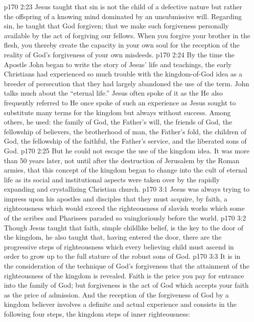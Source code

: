 \vs p170 2:23 Jesus taught that sin is not the child of a defective nature but rather the offspring of a knowing mind dominated by an unsubmissive will. Regarding sin, he taught that God  forgiven; that we make such forgiveness personally available by the act of forgiving our fellows. When you forgive your brother in the flesh, you thereby create the capacity in your own soul for the reception of the reality of God’s forgiveness of your own misdeeds.
\vs p170 2:24 By the time the Apostle John began to write the story of Jesus’ life and teachings, the early Christians had experienced so much trouble with the kingdom\hyp{}of\hyp{}God idea as a breeder of persecution that they had largely abandoned the use of the term. John talks much about the “eternal life.” Jesus often spoke of it as the  He also frequently referred to  He once spoke of such an experience as  Jesus sought to substitute many terms for the kingdom but always without success. Among others, he used: the family of God, the Father’s will, the friends of God, the fellowship of believers, the brotherhood of man, the Father’s fold, the children of God, the fellowship of the faithful, the Father’s service, and the liberated sons of God.
\vs p170 2:25 But he could not escape the use of the kingdom idea. It was more than 50 years later, not until after the destruction of Jerusalem by the Roman armies, that this concept of the kingdom began to change into the cult of eternal life as its social and institutional aspects were taken over by the rapidly expanding and crystallizing Christian church.
\vs p170 3:1 Jesus was always trying to impress upon his apostles and disciples that they must acquire, by faith, a righteousness which would exceed the righteousness of slavish works which some of the scribes and Pharisees paraded so vaingloriously before the world.
\vs p170 3:2 Though Jesus taught that faith, simple childlike belief, is the key to the door of the kingdom, he also taught that, having entered the door, there are the progressive steps of righteousness which every believing child must ascend in order to grow up to the full stature of the robust sons of God.
\vs p170 3:3 It is in the consideration of the technique of  God’s forgiveness that the attainment of the righteousness of the kingdom is revealed. Faith is the price you pay for entrance into the family of God; but forgiveness is the act of God which accepts your faith as the price of admission. And the reception of the forgiveness of God by a kingdom believer involves a definite and actual experience and consists in the following four steps, the kingdom steps of inner righteousness:
